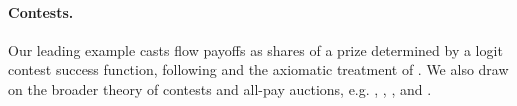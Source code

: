 \documentclass[12pt,reqno]{article}
\theoremstyle{definition} \newtheorem{example}{Example}
\theoremstyle{definition} \newtheorem{condition}{Condition}
\theoremstyle{definition} \newtheorem{corollary}{Corollary}
\theoremstyle{definition} \newtheorem{claim}{Claim}
\theoremstyle{definition} \newtheorem{definition}{Definition}
\theoremstyle{definition} \newtheorem{conjecture}{Conjecture}
\theoremstyle{definition} \newtheorem{Lemma}{Lemma}
\theoremstyle{definition} \newtheorem{lemma}{Lemma}
\theoremstyle{plain} \newtheorem{theorem}{Theorem}
\theoremstyle{definition} \newtheorem{assumption}{Assumption}
\theoremstyle{definition} \newtheorem*{assumptionnonumber}{Assumption}
\theoremstyle{definition} \newtheorem*{theoremNoNumber}{Proposition}
\theoremstyle{definition}
\theoremstyle{definition}\newtheorem{proposition}{Proposition}
\theoremstyle{definition} \newtheorem{result}{Result}
\theoremstyle{definition} \newtheorem*{definitionNoNumber}{Definition}
\theoremstyle{definition} \newtheorem{Definition}{Definition}
\theoremstyle{definition} \newtheorem*{DefinitionNoNumber}{Definition}
\theoremstyle{definition} \newtheorem*{fact}{Fact}
\theoremstyle{definition} \newtheorem*{property}{Property}
\theoremstyle{definition} \newtheorem{remark}{Remark}
\begin{document}
\paragraph{Contests.}
Our leading example casts flow payoffs as shares of a prize determined by a
logit contest success function, following \citet{tullock1980efficient} and the
axiomatic treatment of \citet{skaperdas1996contest}. We also draw on the broader
theory of contests and all-pay auctions, e.g.  \citet{baye1996allpay},
\citet{moldovanu2001optimal}, \citet{siegel2009allpay}, and 
\citet{konrad2009strategy}. 



\end{document}
